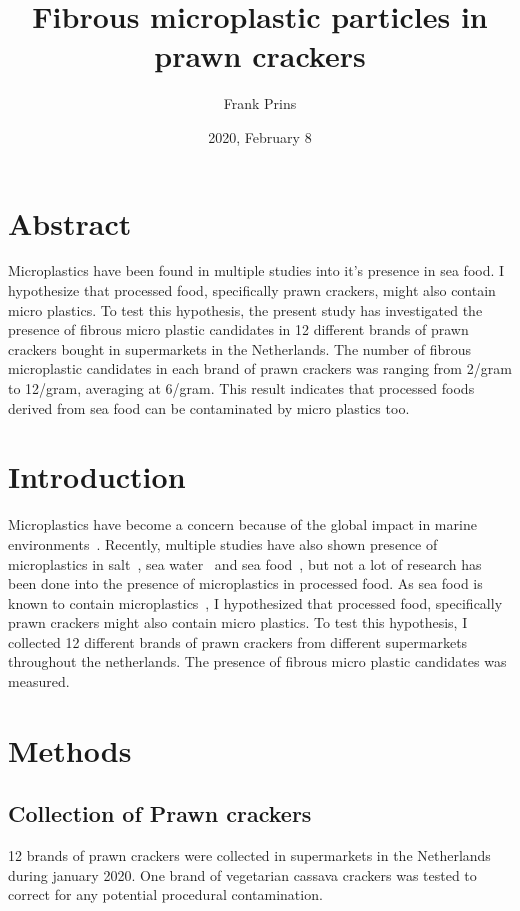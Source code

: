\documentclass[11pt]{article}
\title{Fibrous microplastic particles in prawn crackers}
\date{2020, February 8}
\author{Frank Prins}
\begin{document}
    \maketitle

    \section{Abstract}
    Microplastics have been found in multiple studies into it's presence in sea food.
    I hypothesize that processed food, specifically prawn crackers, might also contain micro plastics.
    To test this hypothesis, the present study has investigated the presence of fibrous micro plastic candidates in 12 different brands of prawn crackers bought in supermarkets in the Netherlands.
    The number of fibrous microplastic candidates in each brand of prawn crackers was ranging from 2/gram to 12/gram, averaging at 6/gram.
    This result indicates that processed foods derived from sea food can be contaminated by micro plastics too.

    \section{Introduction}
    Microplastics have become a concern because of the global impact in marine environments~\cite{andrady2011microplastics,woodall2014deep}.
    Recently, multiple studies have also shown presence of microplastics in salt~\cite{yang2015microplastic,karami2017presence}, sea water~\cite{woodall2014deep,van2013microplastic} and sea food~\cite{efsa2016presence}, but not a lot of research has been done into the presence of microplastics in processed food.
    As sea food is known to contain microplastics~\cite{efsa2016presence}, I hypothesized that processed food, specifically prawn crackers might also contain micro plastics.
    To test this hypothesis, I collected 12 different brands of prawn crackers from different supermarkets throughout the netherlands.
    The presence of fibrous micro plastic candidates was measured.

    \section{Methods}
        \subsection{Collection of Prawn crackers}
            12 brands of prawn crackers were collected in supermarkets in the Netherlands during january 2020.
            One brand of vegetarian cassava crackers was tested to correct for any potential procedural contamination.
\end{document}

